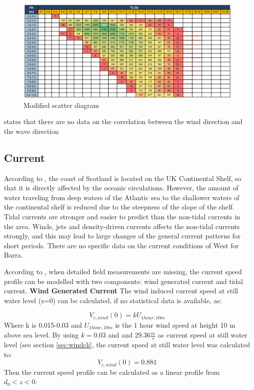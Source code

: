 \begin{figure}[H]
\centering
\includegraphics[scale=0.8]{figures/scatternew}
\caption[$\; \:$Modified scatter diagram ]{Modified scatter diagram  }
 \label{fig:scatn}
\end{figure}
 
 \noindent \cite{Lifes50+D1.1} states that there are no data on the correlation between the wind direction and the wave direction 
 \subsection{Current}
 \label{sec:current}
 According to \cite{Lifes50+D1.1}, the coast of Scotland is located on the UK Continental Shelf, so that it is directly affected by the oceanic circulations. However, the amount of water traveling from deep waters of the Atlantic sea to the shallower waters of the continental shelf is reduced due to the steepness of the slope of the shelf. Tidal currents are stronger and easier to predict than the non-tidal currents in the area. Winds, jets and density-driven currents affects the non-tidal currents strongly, and this may lead to large changes of the general current patterns for short periods. There are no specific data on the current conditions of West for Barra. 
 \newline 
 \newline
 
\noindent According to \cite{dnvenviroment}, when detailed field measurements are missing, the current speed profile can be modelled with two components: wind generated current and tidal current. \newline
  \newline
  \textbf{Wind Generated Current}
  The wind induced current speed at still water level (z=0) can be calculated, if no statistical data is available, as:
  
  \begin{equation}
      V_{c,wind}(0)=k U_{1hour,10m}
  \end{equation}
  Where k is 0.015-0.03 and $U_{1hour,10m}$ is the 1 hour wind speed at height 10 m above sea level.\newline
  \newline
  By using $k=0.03$ and and 29.36$\frac{m}{s}$ as current speed at still water level (see section \ref{sec:windcli}, the current speed at still water level was calculated to:\newline
\newline
$$V_{c,wind}(0)=0.881$$   
  Then the current speed profile can be calculated as a linear profile from $d_0 < z < 0$:
  
